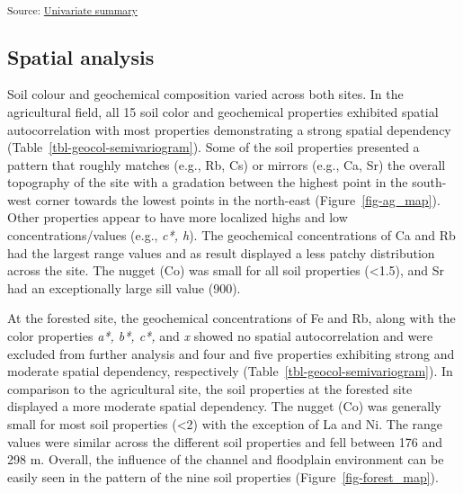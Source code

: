 \documentclass[
  number]{elsarticle}
\begin{document}
\textsubscript{Source:
\href{https://alex-koiter.github.io/spatial-variability-soil-manuscript/notebooks/univariate_summary.qmd.html\#cell-tbl-univariate2-summary}{Univariate
summary}}

\subsection{Spatial analysis}\label{spatial-analysis}

Soil colour and geochemical composition varied across both sites. In the
agricultural field, all 15 soil color and geochemical properties
exhibited spatial autocorrelation with most properties demonstrating a
strong spatial dependency (Table~\ref{tbl-geocol-semivariogram}). Some
of the soil properties presented a pattern that roughly matches (e.g.,
Rb, Cs) or mirrors (e.g., Ca, Sr) the overall topography of the site
with a gradation between the highest point in the south-west corner
towards the lowest points in the north-east (Figure~\ref{fig-ag_map}).
Other properties appear to have more localized highs and low
concentrations/values (e.g., \emph{c*, h}). The geochemical
concentrations of Ca and Rb had the largest range values and as result
displayed a less patchy distribution across the site. The nugget (Co)
was small for all soil properties (\textless1.5), and Sr had an
exceptionally large sill value (900).

At the forested site, the geochemical concentrations of Fe and Rb, along
with the color properties \emph{a*, b*, c*,} and \emph{x} showed no
spatial autocorrelation and were excluded from further analysis and four
and five properties exhibiting strong and moderate spatial dependency,
respectively (Table~\ref{tbl-geocol-semivariogram}). In comparison to
the agricultural site, the soil properties at the forested site
displayed a more moderate spatial dependency. The nugget (Co) was
generally small for most soil properties (\textless2) with the exception
of La and Ni. The range values were similar across the different soil
properties and fell between 176 and 298 m. Overall, the influence of the
channel and floodplain environment can be easily seen in the pattern of
the nine soil properties (Figure~\ref{fig-forest_map}).
\end{document}
